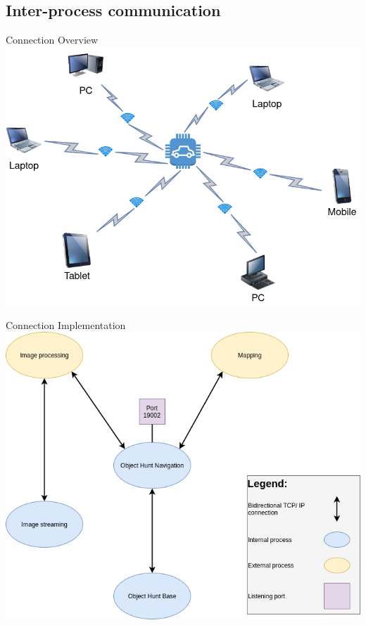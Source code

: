 \documentclass{beamer}
\begin{document}
\subsection{Inter-process communication}

\begin{frame}{Connection Overview}
\centering
\includegraphics[scale=0.32]{sources/connection_overview.png}
\end{frame}

\begin{frame}{Connection Implementation}
\centering
\includegraphics[scale=0.32]{sources/software_structure.png}
\end{frame}
\end{document}
